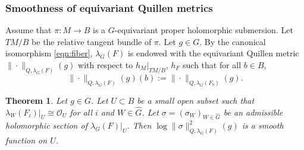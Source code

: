 \documentclass[amscd, leqno]{amsart}
\theoremstyle{plain}
\newtheorem{theorem}{Theorem}[section]
\theoremstyle{definition}
\theoremstyle{remark}
\begin{document}
\subsubsection
{Smoothness of equivariant Quillen metrics}
\label{sect:1.3.3}
\par
Assume that $\pi \colon M \to B$ is a $G$-equivariant proper holomorphic submersion. Let $TM/B$ be the relative tangent bundle of $\pi$.
Let $g \in G$. By the canonical isomorphism \eqref{eqn:fiber}, $\lambda_{G}(F)$ is endowed with the equivariant Quillen metric 
$\|\cdot\|_{Q,\lambda_{G}(F)}(g)$ with respect to $h_{M}|_{TM/B}$, $h_{F}$ such that for all $b\in B$,
$$
\|\cdot\|_{Q,\lambda_{G}(F)}(g)(b):=\|\cdot\|_{Q,\lambda_{G}(F_{b})}(g).
$$


\begin{theorem}
\label{thm:smooth:eq:Quillen}
Let $g \in G$. Let $U\subset B$ be a small open subset such that $\lambda_{W}(F_{i})|_{U}\cong{\mathcal O}_{U}$ for all $i$ and $W\in\widehat{G}$.
Let $\sigma=(\sigma_{W})_{W\in\widehat{G}}$ be an admissible holomorphic section of $\lambda_{G}(F)|_{U}$. 
Then $\log\|\sigma\|_{Q,\lambda_{G}(F)}^{2}(g)$ is a smooth function on $U$.
\end{theorem}
\end{document}
